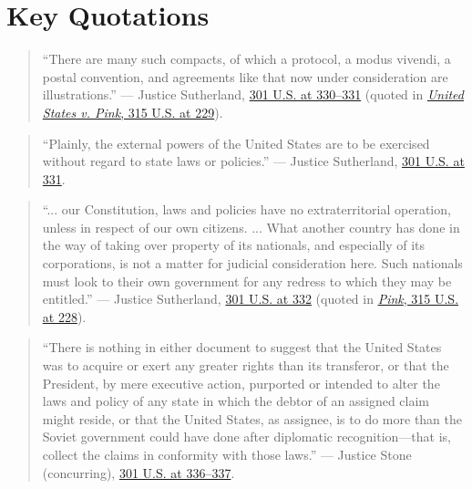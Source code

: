 \documentclass[12pt]{article}
\begin{document}
\section{Key Quotations}

\begin{quote}
``There are many such compacts, of which a protocol, a modus vivendi, a postal convention, and agreements like that now under consideration are illustrations.''
--- Justice Sutherland, \href{https://www.law.cornell.edu/supremecourt/text/301/324}{301 U.S. at 330--331} (quoted in \href{https://www.law.cornell.edu/supremecourt/text/315/203}{\textit{United States v. Pink}, 315 U.S. at 229}).
\end{quote}

\begin{quote}
``Plainly, the external powers of the United States are to be exercised without regard to state laws or policies.''
--- Justice Sutherland, \href{https://supreme.justia.com/cases/federal/us/301/324/}{301 U.S. at 331}.
\end{quote}

\begin{quote}
``... our Constitution, laws and policies have no extraterritorial operation, unless in respect of our own citizens. ... What another country has done in the way of taking over property of its nationals, and especially of its corporations, is not a matter for judicial consideration here. Such nationals must look to their own government for any redress to which they may be entitled.''
--- Justice Sutherland, \href{https://supreme.justia.com/cases/federal/us/301/324/}{301 U.S. at 332} (quoted in \href{https://supreme.justia.com/cases/federal/us/315/203}{\textit{Pink}, 315 U.S. at 228}).
\end{quote}

\begin{quote}
``There is nothing in either document to suggest that the United States was to acquire or exert any greater rights than its transferor, or that the President, by mere executive action, purported or intended to alter the laws and policy of any state in which the debtor of an assigned claim might reside, or that the United States, as assignee, is to do more than the Soviet government could have done after diplomatic recognition---that is, collect the claims in conformity with those laws.''
--- Justice Stone (concurring), \href{https://www.law.cornell.edu/supremecourt/text/301/324}{301 U.S. at 336--337}.
\end{quote}
\end{document}
